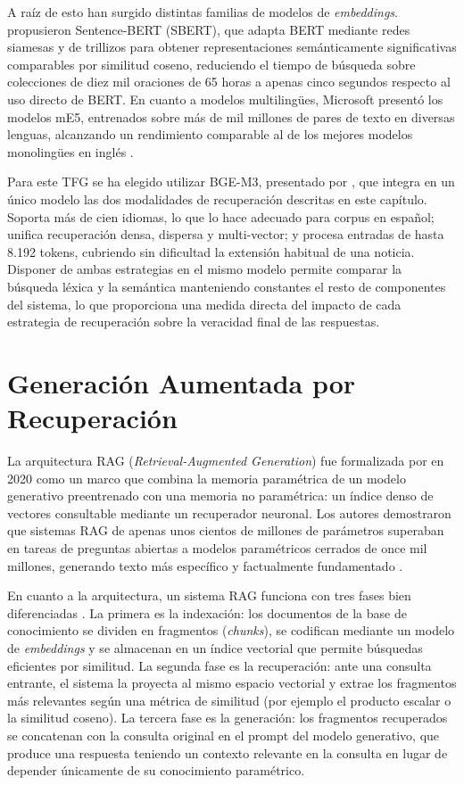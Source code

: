 A raíz de esto han surgido distintas familias de modelos de \textit{embeddings}. \citet{reimers2019sbert} propusieron Sentence-BERT (SBERT), que adapta BERT mediante redes siamesas y de trillizos para obtener representaciones semánticamente significativas comparables por similitud coseno, reduciendo el tiempo de búsqueda sobre colecciones de diez mil oraciones de 65 horas a apenas cinco segundos respecto al uso directo de BERT. En cuanto a modelos multilingües, Microsoft presentó los modelos mE5, entrenados sobre más de mil millones de pares de texto en diversas lenguas, alcanzando un rendimiento comparable al de los mejores modelos monolingües en inglés \cite{wang2024multilingual}.

Para este TFG se ha elegido utilizar BGE-M3, presentado por \citet{chen2024bge}, que integra en un único modelo las dos modalidades de recuperación descritas en este capítulo. Soporta más de cien idiomas, lo que lo hace adecuado para corpus en español; unifica recuperación densa, dispersa y multi-vector; y procesa entradas de hasta 8.192 tokens, cubriendo sin dificultad la extensión habitual de una noticia. Disponer de ambas estrategias en el mismo modelo permite comparar la búsqueda léxica y la semántica manteniendo constantes el resto de componentes del sistema, lo que proporciona una medida directa del impacto de cada estrategia de recuperación sobre la veracidad final de las respuestas.

\section{Generación Aumentada por Recuperación}

La arquitectura RAG (\textit{Retrieval-Augmented Generation}) fue formalizada por \citet{lewis2020rag} en 2020 como un marco que combina la memoria paramétrica de un modelo generativo preentrenado con una memoria no paramétrica: un índice denso de vectores consultable mediante un recuperador neuronal. Los autores demostraron que sistemas RAG de apenas unos cientos de millones de parámetros superaban en tareas de preguntas abiertas a modelos paramétricos cerrados de once mil millones, generando texto más específico y factualmente fundamentado \cite{lewis2020rag}.

En cuanto a la arquitectura, un sistema RAG funciona con tres fases bien diferenciadas \cite{gao2024rag}. La primera es la indexación: los documentos de la base de conocimiento se dividen en fragmentos (\textit{chunks}), se codifican mediante un modelo de \textit{embeddings} y se almacenan en un índice vectorial que permite búsquedas eficientes por similitud. La segunda fase es la recuperación: ante una consulta entrante, el sistema la proyecta al mismo espacio vectorial y extrae los fragmentos más relevantes según una métrica de similitud (por ejemplo el producto escalar o la similitud coseno). La tercera fase es la generación: los fragmentos recuperados se concatenan con la consulta original en el prompt del modelo generativo, que produce una respuesta teniendo un contexto relevante en la consulta en lugar de depender únicamente de su conocimiento paramétrico.

